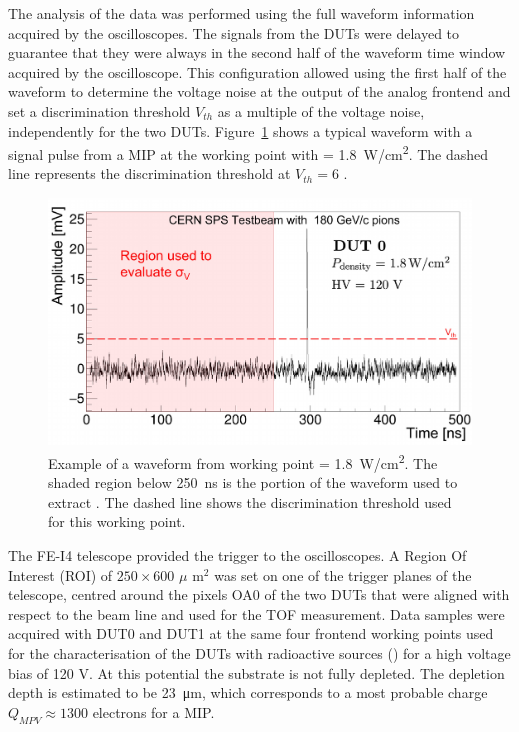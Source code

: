 		The analysis of the data was performed using the full waveform information acquired by the oscilloscopes. The signals from the DUTs were delayed to guarantee that they were always in the second half of the waveform time window acquired by the oscilloscope.
		This configuration allowed using the first half of the waveform to determine the voltage noise \noise at the output of the analog frontend and set a discrimination threshold $V_{th}$ as a multiple of the voltage noise, independently for the two DUTs. Figure~\ref{im:ATTRACT_waveform} shows a typical waveform with a signal pulse from a MIP at the working point with  \power = \SI{1.8}{\watt/\centi\meter^2}. The dashed line represents the discrimination threshold at $V_{th}=6$ \noise.

		\begin{figure}[h]
			\centering
			\includegraphics[width=0.75\linewidth]{files/ATTRACT_paper/Waveform_analysis}
			\caption{Example of a waveform from working point \power = \SI{1.8}{\watt/\centi\meter^2}. The shaded region below \SI{250}{\nano\second} is the portion of the waveform used to extract \noise. The dashed line shows the discrimination threshold used for this working point.}
			\label{im:ATTRACT_waveform} 
		\end{figure}

		The FE-I4 telescope provided the trigger to the oscilloscopes. A Region Of Interest (ROI) of $ 250 \times 600 $  $\mu$ m$^2$ was set on one of the trigger planes of the telescope, centred around the pixels OA0 of the two DUTs that were aligned with respect to the beam line and used for the TOF measurement.
		Data samples were acquired with DUT0 and DUT1 at the same four frontend working points used for the characterisation of the DUTs with radioactive sources () for a high voltage bias of 120 V. At this potential the substrate is not fully depleted. The depletion depth is estimated to be \SI{23}{\micro\meter}, which corresponds to a most probable charge $ Q_{MPV} \approx 1300 $ electrons for a MIP. 

